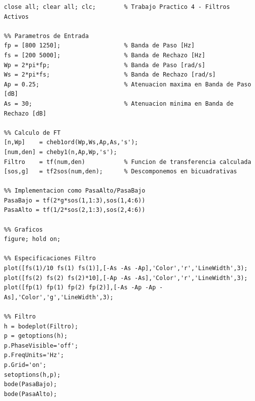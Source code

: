 \documentclass[12pt,a4paper]{article}
\begin{document}
\begin{lstlisting}[style=matlab]
close all; clear all; clc;        % Trabajo Practico 4 - Filtros Activos

%% Parametros de Entrada
fp = [800 1250];                  % Banda de Paso [Hz]
fs = [200 5000];                  % Banda de Rechazo [Hz]
Wp = 2*pi*fp;                     % Banda de Paso [rad/s]
Ws = 2*pi*fs;                     % Banda de Rechazo [rad/s]
Ap = 0.25;                        % Atenuacion maxima en Banda de Paso [dB]
As = 30;                          % Atenuacion minima en Banda de Rechazo [dB]

%% Calculo de FT
[n,Wp]    = cheb1ord(Wp,Ws,Ap,As,'s');
[num,den] = cheby1(n,Ap,Wp,'s');
Filtro    = tf(num,den)           % Funcion de transferencia calculada
[sos,g]   = tf2sos(num,den);      % Descomponemos en bicuadrativas

%% Implementacion como PasaAlto/PasaBajo
PasaBajo = tf(2*g*sos(1,1:3),sos(1,4:6))
PasaAlto = tf(1/2*sos(2,1:3),sos(2,4:6))

%% Graficos
figure; hold on;

%% Especificaciones Filtro
plot([fs(1)/10 fs(1) fs(1)],[-As -As -Ap],'Color','r','LineWidth',3);
plot([fs(2) fs(2) fs(2)*10],[-Ap -As -As],'Color','r','LineWidth',3);
plot([fp(1) fp(1) fp(2) fp(2)],[-As -Ap -Ap -As],'Color','g','LineWidth',3);

%% Filtro
h = bodeplot(Filtro);
p = getoptions(h);
p.PhaseVisible='off';
p.FreqUnits='Hz';
p.Grid='on';
setoptions(h,p);
bode(PasaBajo);
bode(PasaAlto);
\end{lstlisting}
\end{document}
